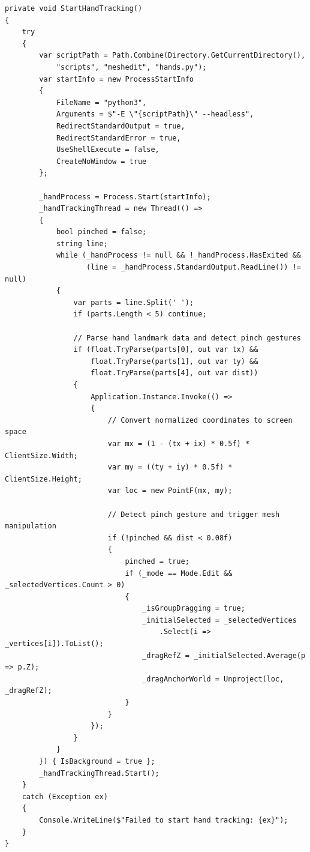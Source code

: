 \begin{verbatim}
private void StartHandTracking()
{
    try
    {
        var scriptPath = Path.Combine(Directory.GetCurrentDirectory(), 
            "scripts", "meshedit", "hands.py");
        var startInfo = new ProcessStartInfo
        {
            FileName = "python3",
            Arguments = $"-E \"{scriptPath}\" --headless",
            RedirectStandardOutput = true,
            RedirectStandardError = true,
            UseShellExecute = false,
            CreateNoWindow = true
        };
        
        _handProcess = Process.Start(startInfo);
        _handTrackingThread = new Thread(() =>
        {
            bool pinched = false;
            string line;
            while (_handProcess != null && !_handProcess.HasExited && 
                   (line = _handProcess.StandardOutput.ReadLine()) != null)
            {
                var parts = line.Split(' ');
                if (parts.Length < 5) continue;
                
                // Parse hand landmark data and detect pinch gestures
                if (float.TryParse(parts[0], out var tx) && 
                    float.TryParse(parts[1], out var ty) &&
                    float.TryParse(parts[4], out var dist))
                {
                    Application.Instance.Invoke(() =>
                    {
                        // Convert normalized coordinates to screen space
                        var mx = (1 - (tx + ix) * 0.5f) * ClientSize.Width;
                        var my = ((ty + iy) * 0.5f) * ClientSize.Height;
                        var loc = new PointF(mx, my);
                        
                        // Detect pinch gesture and trigger mesh manipulation
                        if (!pinched && dist < 0.08f)
                        {
                            pinched = true;
                            if (_mode == Mode.Edit && _selectedVertices.Count > 0)
                            {
                                _isGroupDragging = true;
                                _initialSelected = _selectedVertices
                                    .Select(i => _vertices[i]).ToList();
                                _dragRefZ = _initialSelected.Average(p => p.Z);
                                _dragAnchorWorld = Unproject(loc, _dragRefZ);
                            }
                        }
                    });
                }
            }
        }) { IsBackground = true };
        _handTrackingThread.Start();
    }
    catch (Exception ex)
    {
        Console.WriteLine($"Failed to start hand tracking: {ex}");
    }
}
\end{verbatim}

